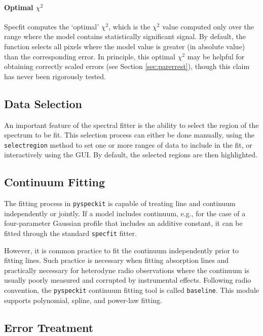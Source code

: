 \documentclass[twocolumn]{aastex62}
\newcommand{\pyspeckit}{\texttt{pyspeckit}\xspace}
\begin{document}
\paragraph{Optimal $\chi^2$}
Specfit computes the `optimal' $\chi^2$, which is the $\chi^2$
value computed only over the range where the model contains statistically
significant signal.  By default, the function selects all pixels where
the model value is greater (in absolute value) than the corresponding error.
In principle, this optimal $\chi^2$ may be helpful for obtaining correctly
scaled errors (see Section \ref{sec:parerrest}), though this claim has never
been rigorously tested.

\subsection{Data Selection}
An important feature of the spectral fitter is the ability to select the region
of the spectrum to be fit.  This selection process can either be done manually,
using the \texttt{selectregion} method to set one or more ranges of data to
include in the fit, or interactively using the GUI.  By default, the selected
regions are then highlighted.

\subsection{Continuum Fitting}
The fitting process in \pyspeckit is capable of treating line and continuum
independently or jointly.  If a model includes continuum, e.g., for the case
of a four-parameter Gaussian profile that includes an additive constant, it
can be fitted through the standard \texttt{specfit} fitter.

However, it is common practice to fit the continuum independently prior to
fitting lines.  Such practice is necessary when fitting absorption lines
and practically necessary for heterodyne radio observations where the
continuum is usually poorly measured and corrupted by instrumental effects.  Following radio convention, the \pyspeckit continuum fitting tool is called \texttt{baseline}. This module supports polynomial, spline, and power-law fitting.

\subsection{Error Treatment}
\end{document}
